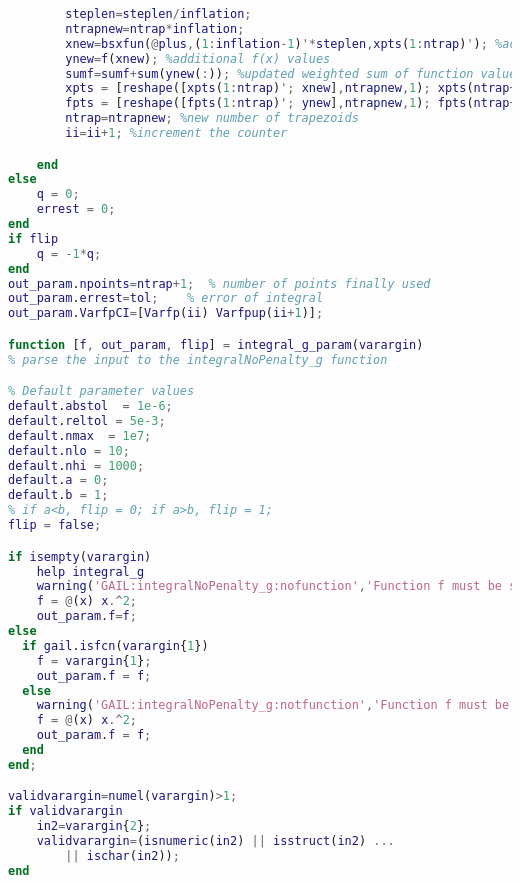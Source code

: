 \documentclass{iitthesis}
\begin{document}
\begin{lstlisting}[language=Matlab]
        %Increase number of sample points
        steplen=steplen/inflation;
        ntrapnew=ntrap*inflation;
        xnew=bsxfun(@plus,(1:inflation-1)'*steplen,xpts(1:ntrap)'); %additional x values
        ynew=f(xnew); %additional f(x) values
        sumf=sumf+sum(ynew(:)); %updated weighted sum of function values
        xpts = [reshape([xpts(1:ntrap)'; xnew],ntrapnew,1); xpts(ntrap+1)];
        fpts = [reshape([fpts(1:ntrap)'; ynew],ntrapnew,1); fpts(ntrap+1)];
        ntrap=ntrapnew; %new number of trapezoids
        ii=ii+1; %increment the counter

    end
else
    q = 0;
    errest = 0;
end
if flip
    q = -1*q;
end
out_param.npoints=ntrap+1;  % number of points finally used
out_param.errest=tol;    % error of integral
out_param.VarfpCI=[Varfp(ii) Varfpup(ii+1)];

function [f, out_param, flip] = integral_g_param(varargin)
% parse the input to the integralNoPenalty_g function

% Default parameter values
default.abstol  = 1e-6;
default.reltol = 5e-3;
default.nmax  = 1e7;
default.nlo = 10;
default.nhi = 1000;
default.a = 0;
default.b = 1;
% if a<b, flip = 0; if a>b, flip = 1;
flip = false;

if isempty(varargin)
    help integral_g
    warning('GAIL:integralNoPenalty_g:nofunction','Function f must be specified. Now GAIL is giving you a toy example of f(x)=x^2.')
    f = @(x) x.^2;
    out_param.f=f;
else
  if gail.isfcn(varargin{1})
    f = varargin{1};
    out_param.f = f;
  else
    warning('GAIL:integralNoPenalty_g:notfunction','Function f must be a function handle. Now GAIL is giving you a toy example of f(x)=x^2.')
    f = @(x) x.^2;
    out_param.f = f;
  end
end;

validvarargin=numel(varargin)>1;
if validvarargin
    in2=varargin{2};
    validvarargin=(isnumeric(in2) || isstruct(in2) ...
        || ischar(in2));
end


\end{lstlisting}
\end{document}
